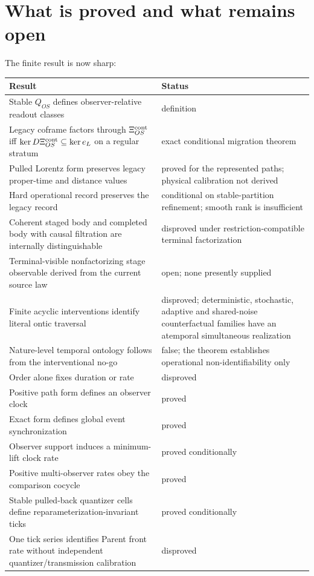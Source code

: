 \documentclass[11pt]{article}
\begin{document}
\section{What is proved and what remains open}

The finite result is now sharp:
\begingroup
\small
\begin{longtable}{L{.44\linewidth}L{.42\linewidth}}
\toprule
Result & Status\\
\midrule
Stable \(Q_{OS}\) defines observer-relative readout classes & definition\\
Legacy coframe factors through \(\Xi^{\rm cont}_{OS}\) iff
\(\ker D\Xi^{\rm cont}_{OS}\subseteq\ker e_L\) on a regular stratum &
exact conditional migration theorem\\
Pulled Lorentz form preserves legacy proper-time and distance values &
proved for the represented paths; physical calibration not derived\\
Hard operational record preserves the legacy record & conditional on
stable-partition refinement; smooth rank is insufficient\\
Coherent staged body and completed body with causal filtration are internally distinguishable & disproved under restriction-compatible terminal factorization\\
Terminal-visible nonfactorizing stage observable derived from the current source law & open; none presently supplied\\
Finite acyclic interventions identify literal ontic traversal & disproved;
deterministic, stochastic, adaptive and shared-noise counterfactual families
have an atemporal simultaneous realization\\
Nature-level temporal ontology follows from the interventional no-go & false;
the theorem establishes operational non-identifiability only\\
Order alone fixes duration or rate & disproved\\
Positive path form defines an observer clock & proved\\
Exact form defines global event synchronization & proved\\
Observer support induces a minimum-lift clock rate & proved conditionally\\
Positive multi-observer rates obey the comparison cocycle & proved\\
Stable pulled-back quantizer cells define reparameterization-invariant ticks & proved conditionally\\
One tick series identifies Parent front rate without independent quantizer/transmission calibration & disproved\\

\end{longtable}
\end{document}
